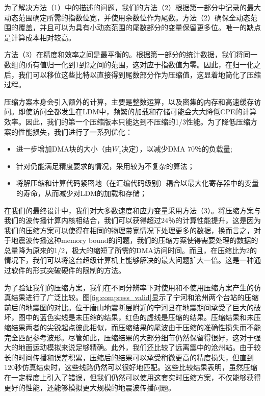 \documentclass[degree=doctor]{thuthesis}
\begin{document}
为了解决方法（1）中的描述的问题，我们的方法（2）根据第一部分中记录的最大动态范围确定所需的指数位宽，并使用余数位作为尾数。方法（2）确保全动态范围的覆盖，并且可以为具有小动态范围的尾数部分的变量保留更多位。唯一的缺点是计算成本相对较高。

方法（3）在精度和效率之间是最平衡的。根据第一部分的统计数据，我们将同一数组的所有值归一化到1到2之间的范围，这对应于指数值为零。因此，在归一化之后，我们可以移位这些比特以直接得到尾数部分作为压缩值，这显着地简化了压缩过程。

压缩方案本身会引入额外的计算，主要是整数运算，以及密集的内存和高速缓存访问。即使访问全都发生在LDM中，频繁的加载和存储可能会大大降低CPE的计算效率。因此，我们的第一个压缩版本只能达到不压缩的1/3性能。为了降低压缩方案的性能损失，我们进行了一系列优化：

\begin{itemize}
  \item 进一步增加DMA块的大小（由$ W_z $决定），以减少DMA 70％的负载量; 
  \item 针对仍能满足精度要求的情况，采用较为不复杂的算法；
  \item 将解压缩和计算代码紧密地（在汇编代码级别）耦合以最大化寄存器中的变量的寿命，从而减少对LDM的加载和存储；
\end{itemize}

在我们的最终设计中，我们对大多数速度和应力变量采用方法（3）。将压缩方案与我们的波传播计算内核相结合，我们可以获得超过24％的计算性能提升，这是因为我们的压缩方案可以使得在相同的物理带宽情况下处理更多的数据，换而言之，对于地震波传播这种memory bound的问题，我们的压缩方案使得需要处理的数据的总量降为原来的1/2，极大的缩短了所需的DMA访问时间。而且，在压缩比为2的情况下，我们可以将这台超级计算机上能够解决的最大问题扩大一倍。这是一种通过软件的形式突破硬件的限制的方法。


为了验证我们的压缩方案，我们在不同分辨率下对使用和不使用压缩方案产生的仿真结果进行了广泛比较。图\ref {fig:compress_valid}显示了宁河和沧州两个台站的压缩前后的地震图的对比。位于唐山地震断层附近的宁河县在地震期间承受了巨大的破坏，图中的蓝色实线是未压缩的结果，红色的虚线是压缩的结果。压缩结果和未压缩结果两者的尖锐起点彼此相似，而压缩结果的尾波由于压缩的准确性损失而不能完全匹配参考波形。尽管如此，压缩结果的大部分细节仍然​​保留得很好，这对于强大的地面运动模拟来说足够精确。此外，我们还比较了远离震中的沧州站。由于较长的时间传播和误差积累，压缩后的结果可以承受稍微更高的精度损失，但直到120秒仿真结束时，这些线路仍然可以很好地匹配。这些比较结果表明，虽然压缩在一定程度上引入了错误，但我们仍然可以使用这套实时压缩方案，不仅能够获得更好的性能，还能够模拟更大规模的地震波传播问题。
\end{document}
